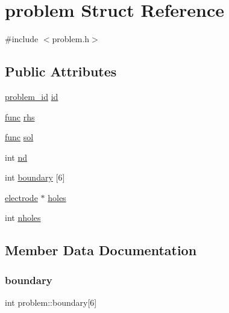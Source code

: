 \hypertarget{structproblem}{}\section{problem Struct Reference}
\label{structproblem}


{\ttfamily \#include $<$problem.\+h$>$}

\subsection*{Public Attributes}
\begin{DoxyCompactItemize}
\item 
\mbox{\hyperlink{problem_8h_acef34e4550d8d3c9873193b0aad44fa0}{problem\+\_\+id}} \mbox{\hyperlink{structproblem_a510ac3e585f726934ca1458ab5a3ad3b}{id}}
\item 
\mbox{\hyperlink{base_8h_a6dd92a1df4b8b4a265cd65db9907ebe5}{func}} \mbox{\hyperlink{structproblem_af65ffdbb0d3d9637c2203edd6ea6b635}{rhs}}
\item 
\mbox{\hyperlink{base_8h_a6dd92a1df4b8b4a265cd65db9907ebe5}{func}} \mbox{\hyperlink{structproblem_a2364d66cb43cac0af9fbfac534b47606}{sol}}
\item 
int \mbox{\hyperlink{structproblem_a109622aa6f753238fb5d9fd0e350e387}{nd}}
\item 
int \mbox{\hyperlink{structproblem_a1f60be89c674d13768cc631d9fc6384b}{boundary}} \mbox{[}6\mbox{]}
\item 
\mbox{\hyperlink{structelectrode}{electrode}} $\ast$ \mbox{\hyperlink{structproblem_a3f48c6e1ab38d32f3438b375c49af9f0}{holes}}
\item 
int \mbox{\hyperlink{structproblem_ad2636a340da9884c974134d5ec84305a}{nholes}}
\end{DoxyCompactItemize}


\subsection{Member Data Documentation}
\mbox{\label{structproblem_a1f60be89c674d13768cc631d9fc6384b}} 
\subsubsection{\texorpdfstring{boundary}{boundary}}
{\footnotesize\ttfamily int problem\+::boundary\mbox{[}6\mbox{]}}

